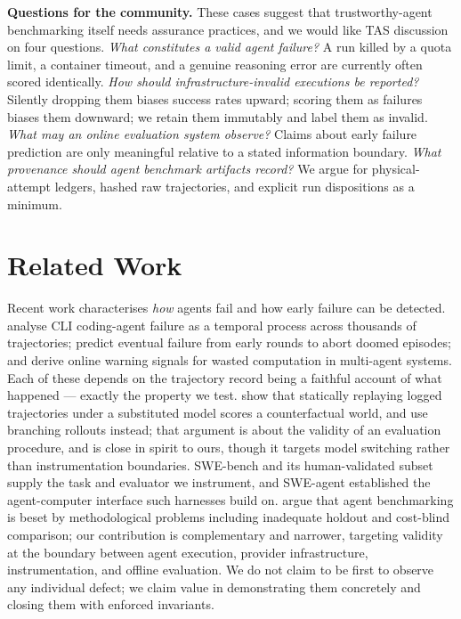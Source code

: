 \documentclass[letterpaper]{article}
\begin{document}
\noindent\textbf{Questions for the community.} These cases suggest that
trustworthy-agent benchmarking itself needs assurance practices, and we would
like TAS discussion on four questions. \emph{What constitutes a valid agent
failure?} A run killed by a quota limit, a container timeout, and a genuine
reasoning error are currently often scored identically. \emph{How should
infrastructure-invalid executions be reported?} Silently dropping them biases
success rates upward; scoring them as failures biases them downward; we retain
them immutably and label them as invalid. \emph{What may an online evaluation
system observe?} Claims about early failure prediction are only meaningful
relative to a stated information boundary. \emph{What provenance should agent
benchmark artifacts record?} We argue for physical-attempt ledgers, hashed raw
trajectories, and explicit run dispositions as a minimum.

\section{Related Work}

Recent work characterises \emph{how} agents fail and how early failure can be
detected. \citet{zhao2026failure} analyse CLI coding-agent failure as a temporal
process across thousands of trajectories; \citet{ruan2026doomed} predict
eventual failure from early rounds to abort doomed episodes; and
\citet{li2026early} derive online warning signals for wasted computation in
multi-agent systems. Each of these depends on the trajectory record being a
faithful account of what happened --- exactly the property we test.
\citet{gonuguntla2026replay} show that statically replaying logged trajectories
under a substituted model scores a counterfactual world, and use branching
rollouts instead; that argument is about the validity of an evaluation
procedure, and is close in spirit to ours, though it targets model switching
rather than instrumentation boundaries. SWE-bench \citep{jimenez2024swebench}
and its human-validated subset \citep{openai2024swebenchverified} supply the
task and evaluator we instrument, and SWE-agent \citep{yang2024sweagent}
established the agent-computer interface such harnesses build on.
\citet{kapoor2024agentsthatmatter} argue that agent benchmarking is beset by
methodological problems including inadequate holdout and cost-blind comparison;
our contribution is complementary and narrower, targeting validity at the
boundary between agent execution, provider infrastructure, instrumentation, and
offline evaluation. We do not claim to be first to observe any individual
defect; we claim value in demonstrating them concretely and closing them with
enforced invariants.
\end{document}
